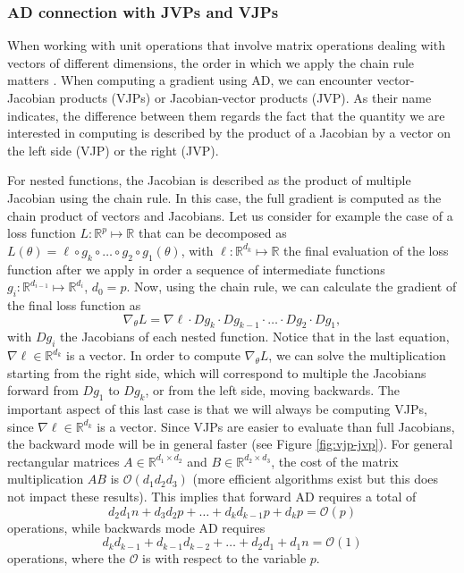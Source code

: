 \subsubsection{AD connection with JVPs and VJPs}

When working with unit operations that involve matrix operations dealing with vectors of different dimensions, the order in which we apply the chain rule matters \cite{Giering_Kaminski_1998}.
When computing a gradient using AD, we can encounter vector-Jacobian products (VJPs) or Jacobian-vector products (JVP).
As their name indicates, the difference between them regards the fact that the quantity we are interested in computing is described by the product of a Jacobian by a vector on the left side (VJP) or the right (JVP).

For nested functions, the Jacobian is described as the product of multiple Jacobian using the chain rule.
In this case, the full gradient is computed as the chain product of vectors and Jacobians. 
Let us consider for example the case of a loss function $L : \mathbb R^p \mapsto \mathbb R$ that can be decomposed as $L(\theta) = \ell \circ g_{k} \circ \ldots \circ g_2 \circ g_1(\theta)$, with $\ell : \mathbb R^{d_k} \mapsto \mathbb R$ the final evaluation of the loss function after we apply in order a sequence of intermediate functions $g_i : \mathbb R^{d_{i-1}} \mapsto \mathbb R^{d_i}$, $d_0 = p$. 
Now, using the chain rule, we can calculate the gradient of the final loss function as
\begin{equation}
 \nabla_\theta L = \nabla \ell \cdot Dg_{k} \cdot Dg_{k-1} \cdot \ldots \cdot Dg_2 \cdot Dg_1, 
\end{equation}
with $Dg_i$ the Jacobians of each nested function. 
Notice that in the last equation, $\nabla \ell \in \mathbb R^{d_k}$ is a vector.
In order to compute $\nabla_\theta L$, we can solve the multiplication starting from the right side, which will correspond to multiple the Jacobians forward from $Dg_1$ to $Dg_k$, or from the left side, moving backwards. 
The important aspect of this last case is that we will always be computing VJPs, since $\nabla \ell \in \mathbb R^{d_k}$ is a vector.
Since VJPs are easier to evaluate than full Jacobians, the backward mode will be in general faster (see Figure \ref{fig:vjp-jvp}). 
For general rectangular matrices $A\in \mathbb R^{d_1 \times d_2}$ and $B \in \mathbb R^{d_2 \times d_3}$, the cost of the matrix multiplication $AB$ is $\mathcal O (d_1 d_2 d_3)$ (more efficient algorithms exist but this does not impact these results). This implies that forward AD requires a total of
\begin{equation}
 d_2 d_1 n + d_3 d_2 p + \ldots + d_k d_{k-1} p + d_k p = \mathcal O (p)
\end{equation}
operations, while backwards mode AD requires
\begin{equation}
 d_k d_{k-1} + d_{k-1} d_{k-2} + \ldots + d_2 d_1 + d_1 n = \mathcal O (1)
\end{equation}
operations, where the $\mathcal O$ is with respect to the variable $p$. 

